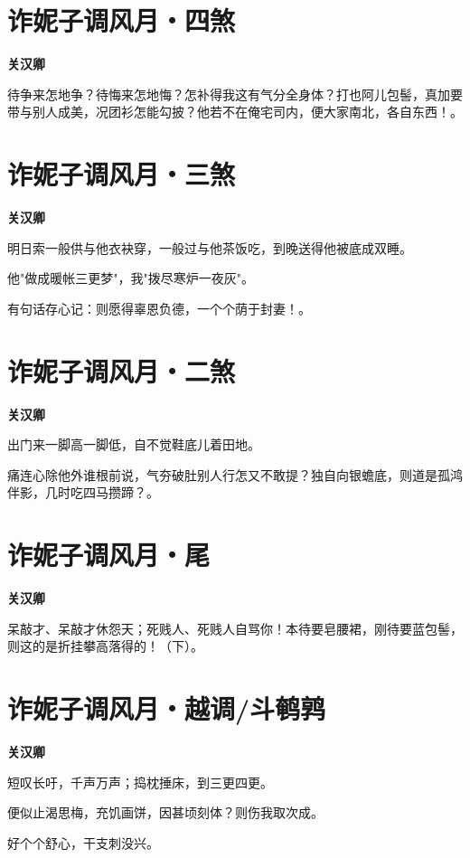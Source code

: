 \documentclass[12pt,a4paper]{ctexbook}
\begin{document}
\section{诈妮子调风月・四煞}
\textbf{关汉卿}\par\vspace{0.5em}
待争来怎地争？待悔来怎地悔？怎补得我这有气分全身体？打也阿儿包髻，真加要带与别人成美，况团衫怎能勾披？他若不在俺宅司内，便大家南北，各自东西！。\par

\section{诈妮子调风月・三煞}
\textbf{关汉卿}\par\vspace{0.5em}
明日索一般供与他衣袂穿，一般过与他茶饭吃，到晚送得他被底成双睡。\par
他"做成暖帐三更梦"，我"拨尽寒炉一夜灰"。\par
有句话存心记：则愿得辜恩负德，一个个荫于封妻！。\par

\section{诈妮子调风月・二煞}
\textbf{关汉卿}\par\vspace{0.5em}
出门来一脚高一脚低，自不觉鞋底儿着田地。\par
痛连心除他外谁根前说，气夯破肚别人行怎又不敢提？独自向银蟾底，则道是孤鸿伴影，几时吃四马攒蹄？。\par

\section{诈妮子调风月・尾}
\textbf{关汉卿}\par\vspace{0.5em}
呆敲才、呆敲才休怨天；死贱人、死贱人自骂你！本待要皂腰裙，刚待要蓝包髻，则这的是折挂攀高落得的！（下）。\par

\section{诈妮子调风月・越调/斗鹌鹑}
\textbf{关汉卿}\par\vspace{0.5em}
短叹长吁，千声万声；捣枕捶床，到三更四更。\par
便似止渴思梅，充饥画饼，因甚顷刻体？则伤我取次成。\par
好个个舒心，干支刺没兴。\par
\end{document}
